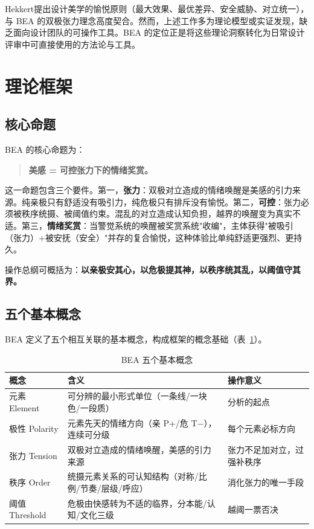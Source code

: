 \documentclass[10pt,a4paper]{article}
\begin{document}
Hekkert\cite{hekkert2006}提出设计美学的愉悦原则（最大效果、最优差异、安全威胁、对立统一），与 BEA 的双极张力理念高度契合。然而，上述工作多为理论模型或实证发现，缺乏面向设计团队的可操作工具。BEA 的定位正是将这些理论洞察转化为日常设计评审中可直接使用的方法论与工具。

\section{理论框架}

\subsection{核心命题}

BEA 的核心命题为：

\begin{quote}
\textbf{美感 = 可控张力下的情绪奖赏。}
\end{quote}

这一命题包含三个要件。第一，\textbf{张力}：双极对立造成的情绪唤醒是美感的引力来源。纯亲极只有舒适没有吸引力，纯危极只有排斥没有愉悦。第二，\textbf{可控}：张力必须被秩序统摄、被阈值约束。混乱的对立造成认知负担，越界的唤醒变为真实不适。第三，\textbf{情绪奖赏}：当警觉系统的唤醒被奖赏系统"收编"，主体获得"被吸引（张力）+被安抚（安全）"并存的复合愉悦，这种体验比单纯舒适更强烈、更持久。

操作总纲可概括为：\textbf{以亲极安其心，以危极提其神，以秩序统其乱，以阈值守其界。}

\subsection{五个基本概念}

BEA 定义了五个相互关联的基本概念，构成框架的概念基础（表~\ref{tab:concepts}）。

\begin{table}[H]
\centering
\caption{BEA 五个基本概念}
\label{tab:concepts}
\begin{tabular}{p{2cm}p{4.5cm}p{5cm}}
\toprule
\textbf{概念} & \textbf{含义} & \textbf{操作意义} \\
\midrule
元素 Element & 可分辨的最小形式单位（一条线/一块色/一段质） & 分析的起点 \\
极性 Polarity & 元素先天的情绪方向（亲 P+/危 T−），连续可分级 & 每个元素必标方向 \\
张力 Tension & 双极对立造成的情绪唤醒，美感的引力来源 & 张力不足加对立，过强补秩序 \\
秩序 Order & 统摄元素关系的可认知结构（对称/比例/节奏/层级/呼应） & 消化张力的唯一手段 \\
阈值 Threshold & 危极由快感转为不适的临界，分本能/认知/文化三级 & 越阈一票否决 \\
\bottomrule
\end{tabular}
\end{table}
\end{document}
